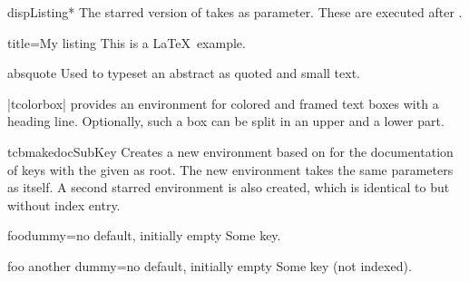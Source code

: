 \begin{docEnvironment}{dispListing*}{}
  The starred version of  takes  
  as parameter. These  are executed after .
\begin{dispExample}
\begin{dispListing*}{title=My listing}
This is a \LaTeX\ example.
\end{dispListing*}
\end{dispExample}
\end{docEnvironment}


\begin{docEnvironment}{absquote}{}
  Used to typeset an abstract as quoted and small text.
\begin{dispExample}
\begin{absquote}
|tcolorbox| provides an environment for colored and framed text boxes with a
heading line. Optionally, such a box can be split in an upper and a lower part.
\end{absquote}
\end{dispExample}
\end{docEnvironment}

\clearpage
\begin{docCommand}[doc updated=2020-04-22]{tcbmakedocSubKey}{}
  Creates a new environment  based on  for the
  documentation of keys with the given  as root.
  The new environment  takes the same para\-meters as  itself.
  A second starred environment  is also created, which is identical
  to  but without index entry.
\begin{dispExample}

\begin{docFooKey}{foodummy}{=}{no default, initially empty}
Some key.
\end{docFooKey}

\begin{docFooKey*}{foo another dummy}{=}{no default, initially empty}
Some key (not indexed).
\end{docFooKey*}
\end{dispExample}
\end{docCommand}


